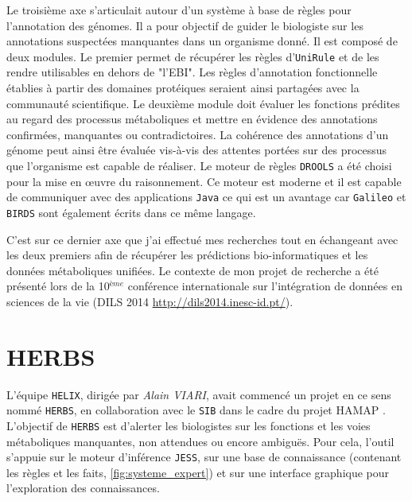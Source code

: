 \begin{refsegment}
Le troisième axe s'articulait autour d'un système à base de règles pour l'annotation des génomes. Il a pour objectif de guider le biologiste sur les annotations suspectées manquantes dans un organisme donné. Il est composé de deux modules. Le premier permet de récupérer les règles d'\texttt{UniRule} et de les rendre utilisables en dehors de "l'\gls{EBI}". Les règles d'annotation fonctionnelle établies à partir des domaines protéiques seraient ainsi partagées avec la communauté scientifique. Le deuxième module doit évaluer les fonctions prédites au regard des processus métaboliques et mettre en évidence des annotations confirmées, manquantes ou contradictoires. La cohérence des annotations d'un génome peut ainsi être évaluée vis-à-vis des attentes portées sur des processus que l'organisme est capable de réaliser. Le moteur de règles \texttt{DROOLS} a été choisi pour la mise en œuvre du raisonnement. Ce moteur est moderne et il est capable de communiquer avec des applications  \texttt{Java} ce  qui est un avantage car \texttt{Galileo} et \texttt{BIRDS} sont également écrits dans ce même langage.

C'est sur ce dernier axe que j'ai effectué mes recherches tout en échangeant avec les deux premiers afin de récupérer les prédictions bio-informatiques et les données métaboliques unifiées. Le contexte de mon projet de recherche a été présenté lors de la 10$^{ème}$ conférence internationale sur l'intégration de données en sciences de la vie (DILS 2014 \url{http://dils2014.inesc-id.pt/}).

\cleardoublepage


\section{HERBS}

L'équipe \texttt{HELIX}, dirigée par \textit{Alain VIARI}, avait commencé un projet en ce sens nommé \texttt{\gls{HERBS}}, en collaboration avec le \texttt{\gls{SIB}} dans le cadre du projet \gls{HAMAP} \cite{pedruzzi2015hamap}. L'objectif de \texttt{\gls{HERBS}} est d'alerter les biologistes sur les fonctions et les voies métaboliques manquantes, non attendues ou encore ambiguës. Pour cela, l'outil s'appuie sur le moteur d'inférence \texttt{\gls{JESS}}, sur une base de connaissance (contenant les règles et les faits, \cref{fig:systeme_expert}) et sur une interface graphique pour l'exploration des connaissances. 


\end{refsegment}

